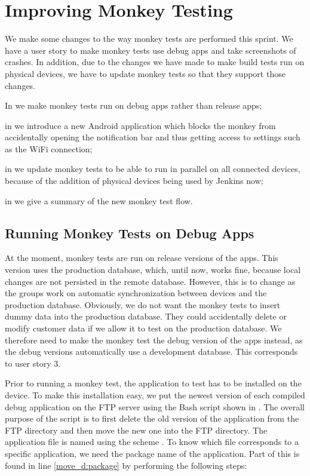 \chapter{Improving Monkey Testing}
We make some changes to the way monkey tests are performed this sprint. We have a user story to make monkey tests use debug apps and take screenshots of crashes. In addition, due to the changes we have made to make build tests run on physical devices, we have to update monkey tests so that they support those changes.

\begin{chapterorganization}
  \item In  we make monkey tests run on debug apps rather than release apps;
  \item in  we introduce a new Android application which blocks the monkey from accidentally opening the notification bar and thus getting access to settings such as the WiFi connection;
  \item in  we update monkey tests to be able to run in parallel on all connected devices, because of the addition of physical devices being used by Jenkins now;
  \item in  we give a summary of the new monkey test flow.
\end{chapterorganization}

\section{Running Monkey Tests on Debug Apps}\label{sec:monkey_test_debug_app}
At the moment, monkey tests are run on release versions of the apps. This version uses the production database, which, until now, works fine, because local changes are not persisted in the remote database. However, this is to change as the \db{} groups work on automatic synchronization between devices and the production database. Obviously, we do not want the monkey tests to insert dummy data into the production database. They could accidentally delete or modify customer data if we allow it to test on the production database. We therefore need to make the monkey test the debug version of the apps instead, as the debug versions automatically use a development database. This corresponds to user story 3.

Prior to running a monkey test, the application to test has to be installed on the device. To make this installation easy, we put the newest version of each compiled debug application on the FTP server using the Bash script shown in . The overall purpose of the script is to first delete the old version of the application from the FTP directory and then move the new one into the FTP directory. The application file is named using the scheme . To know which file corresponds to a specific application, we need the package name of the application. Part of this is found in line \ref{move_d:package} by performing the following steps:

